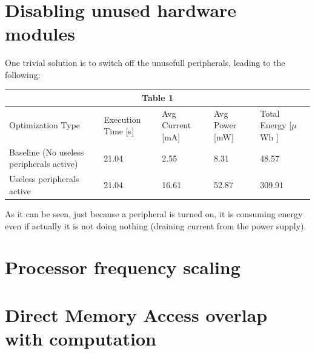 \documentclass[11pt,a4paper,twoside,french,svgnames]{report}
\begin{document}
\section{Disabling unused hardware modules }
One trivial solution is to switch off the unusefull peripherals, leading to the following:
\newline

\begin{tabular}{|p{3.5cm}||p{2.3cm}|p{2.3cm}|p{2.0cm}|p{2.5cm}|  }
 \hline
 \multicolumn{5}{|c|}{ Table 1} \\
 \hline
 Optimization Type&Execution Time [s] &Avg Current [mA]&Avg Power [mW] & Total Energy   [$\mu$Wh ] \\
 \hline
 Baseline \newline (No useless peripherals active)& 21.04 & 2.55 & 8.31 & 48.57\\
 \hline
  Useless peripherals active & 21.04 & 16.61 & 52.87 & 309.91\\
 \hline
 
\end{tabular}
\newline

As it can be seen, just because a peripheral is turned on, it is consuming energy even if actually it is not doing nothing (draining current from the power supply).

\section{Processor frequency scaling}

\section{Direct Memory Access overlap with computation }
\end{document}

